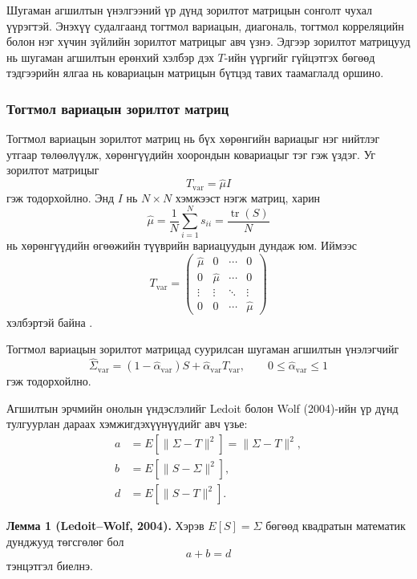 Шугаман агшилтын үнэлгээний үр дүнд зорилтот матрицын сонголт
чухал үүрэгтэй. Энэхүү судалгаанд тогтмол вариацын, диагональ,
тогтмол корреляцийн болон нэг хүчин зүйлийн зорилтот матрицыг
авч үзнэ. Эдгээр зорилтот матрицууд нь шугаман агшилтын
ерөнхий хэлбэр дэх $T$-ийн үүргийг гүйцэтгэх бөгөөд тэдгээрийн
ялгаа нь ковариацын матрицын бүтцэд тавих таамаглалд оршино.


\subsubsection{Тогтмол вариацын зорилтот матриц}

Тогтмол вариацын зорилтот матриц нь бүх хөрөнгийн
вариацыг нэг нийтлэг утгаар төлөөлүүлж, хөрөнгүүдийн
хоорондын ковариацыг тэг гэж үздэг.
Уг зорилтот матрицыг
\[
T_{\mathrm{var}}=\widehat{\mu}I
\]
гэж тодорхойлно. Энд $I$ нь $N\times N$
хэмжээст нэгж матриц, харин
\[
\widehat{\mu}
=
\frac{1}{N}\sum_{i=1}^{N}s_{ii}
=
\frac{\operatorname{tr}(S)}{N}
\]
нь хөрөнгүүдийн өгөөжийн түүврийн
вариацуудын дундаж юм. Иймээс
\[
T_{\mathrm{var}}
=
\begin{pmatrix}
	\widehat{\mu}&0&\cdots&0\\
	0&\widehat{\mu}&\cdots&0\\
	\vdots&\vdots&\ddots&\vdots\\
	0&0&\cdots&\widehat{\mu}
\end{pmatrix}
\]
хэлбэртэй байна \citep{ledoitwolf2004b}.

Тогтмол вариацын зорилтот матрицад
суурилсан шугаман агшилтын үнэлэгчийг
\[
\widehat{\Sigma}_{\mathrm{var}}
=
(1-\widehat{\alpha}_{\mathrm{var}})S
+
\widehat{\alpha}_{\mathrm{var}}T_{\mathrm{var}},
\qquad
0\leq\widehat{\alpha}_{\mathrm{var}}\leq1
\]
гэж тодорхойлно.

Агшилтын эрчмийн онолын үндэслэлийг
Ledoit болон Wolf (2004)-ийн үр дүнд
тулгуурлан дараах хэмжигдэхүүнүүдийг авч үзье:
\[
\begin{aligned}
	a&=E\left[\|\Sigma-T\|^2\right]=\|\Sigma-T\|^2,\\
	b&=E\left[\|S-\Sigma\|^2\right],\\
	d&=E\left[\|S-T\|^2\right].
\end{aligned}
\]

\medskip
\noindent
\textbf{Лемма 1 (Ledoit--Wolf, 2004).}
Хэрэв $E[S]=\Sigma$ бөгөөд квадратын математик дунджууд төгсгөлөг бол
\[
a+b=d
\]
тэнцэтгэл биелнэ.

